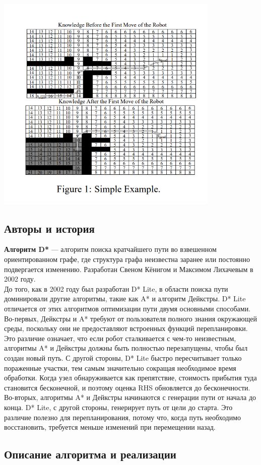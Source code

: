 \documentclass[12pt]{article}
\begin{document}
\begin{center}
 \includegraphics[width=0.8\textwidth]{img/figure1.png}
\end{center}
\newpage
\begin{center}
   \section*{Авторы и история} 
\end{center}
\textbf{Алгоритм D*} — алгоритм поиска кратчайшего пути во взвешенном ориентированном графе, где структура графа неизвестна заранее или постоянно подвергается изменению. Разработан Свеном Кёнигом и Максимом Лихачевым в 2002 году.\\

До того, как в 2002 году был разработан D* Lite, в области поиска пути доминировали другие алгоритмы, такие как A* и алгоритм Дейкстры. D* Lite отличается от этих алгоритмов оптимизации пути двумя основными способами.\\ Во-первых, Дейкстры и A* требуют от пользователя полного знания окружающей среды, поскольку они не предоставляют встроенных функций перепланировки. Это различие означает, что если робот сталкивается с чем-то неизвестным, алгоритмы A* и Дейкстры должны быть полностью перезапущены, чтобы был создан новый путь. С другой стороны, D* Lite быстро пересчитывает только пораженные участки, тем самым значительно сокращая необходимое время обработки. Когда узел обнаруживается как препятствие, стоимость прибытия туда становится бесконечной, и поэтому оценка RHS обновляется до бесконечности.\\Во-вторых, алгоритмы A* и Дейкстры начинаются с генерации пути от начала до конца. D* Lite, с другой стороны, генерирует путь от цели до старта. Это различие полезно для перепланирования, потому что, когда путь необходимо восстановить, требуется меньше изменений при перемещении назад.
\newpage
\begin{center}
   \section*{Описание алгоритма и реализации} 
\end{center}
\end{document}
